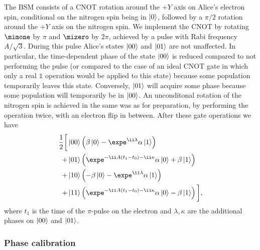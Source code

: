 The BSM consists of a CNOT rotation around the $+Y$ axis on Alice's electron spin, conditional on the nitrogen spin being in $\left|0\right>$, followed by a $\pi/2$ rotation around the $+Y$ axis on the nitrogen spin. We implement the CNOT by rotating $\mimone$ by $\pi$ and $\mizero$ by $2\pi$, achieved by a pulse with Rabi frequency $A/\sqrt{3}$. During this pulse Alice's states $\left|00\right>$ and $\left|01\right>$ are not unaffected. In particular, the time-dependent phase of the state $\left|00\right>$ is reduced compared to not performing the pulse (or compared to the case of an ideal CNOT gate in which only a real $\mathbb{1}$ operation would be applied to this state) because some population temporarily leaves this state. Conversely, $\left|01\right>$ will acquire some phase because some population will temporarily be in $\left|00\right>$. An unconditonal rotation of the nitrogen spin is achieved in the same was as for preparation, by performing the operation twice, with an electron flip in between. After these gate operations we have
\begin{align}
    \frac{1}{2} \bigg[
          & \ket{00} \left( \beta\ket0 - 
            \expe^{\ii\lambda}\alpha\ket1 \right) \notag\\
        + & \ket{01} \left( \expe^{-\ii A(t_1-t_0)-\ii\kappa}\alpha\ket0 +
            \beta\ket1 \right) \notag\\
        + & \ket{10} \left( -\beta\ket0 - 
            \expe^{\ii\lambda}\alpha\ket1 \right) \notag\\
        + & \ket{11} \left( \expe^{-\ii A(t_1-t_0)-\ii\kappa}\alpha\ket0 -
            \beta\ket1 \right)
    \bigg],
\end{align}
where $t_1$ is the time of the $\pi$-pulse on the electron and $\lambda,\kappa$ are the additional phases on $\left|00\right>$ and $\left|01\right>$.

\subsubsection{Phase calibration}


